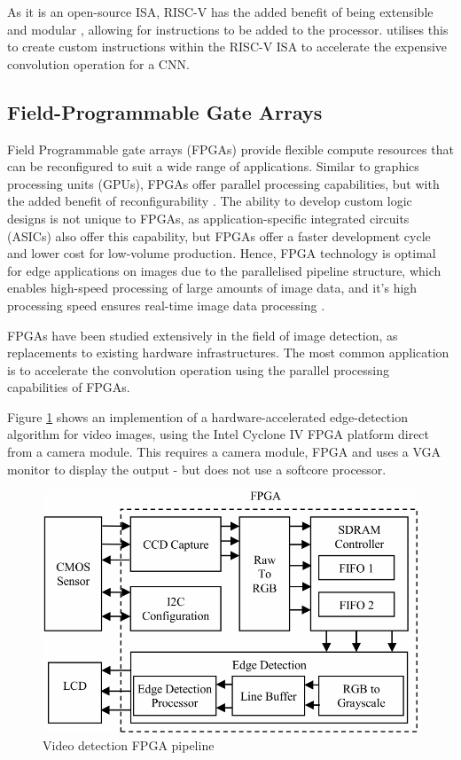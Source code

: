 As it is an open-source ISA, RISC-V has the added benefit of being extensible and modular \cite{Cryptography}, allowing for instructions to be added to the processor.
\cite{Reconfigurable} utilises this to create custom instructions within the RISC-V ISA to accelerate the expensive convolution operation for a CNN.

\subsection{Field-Programmable Gate Arrays}
Field Programmable gate arrays (FPGAs) provide flexible compute resources that can be reconfigured to suit a wide range of applications.
Similar to graphics processing units (GPUs), FPGAs offer parallel processing capabilities, but with the added benefit of reconfigurability \cite{Parallelism}.
The ability to develop custom logic designs is not unique to FPGAs, as application-specific integrated circuits (ASICs) also offer this capability, but FPGAs offer a faster development cycle and lower cost for low-volume production.
Hence, FPGA technology is optimal for edge applications on images due to the parallelised pipeline structure, which enables high-speed processing of large amounts of image data, and it's high processing speed ensures real-time image data processing \cite{Video}.

FPGAs have been studied extensively in the field of image detection, as replacements to existing hardware infrastructures. 
The most common application is to accelerate the convolution operation using the parallel processing capabilities of FPGAs. 

Figure \ref{fig:gradient} shows an implemention of a hardware-accelerated edge-detection algorithm for video images, using the Intel Cyclone IV FPGA platform direct from a camera module. 
This requires a camera module, FPGA and uses a VGA monitor to display the output - but does not use a softcore processor. 

\begin{figure}[h]
    \centering
    \includegraphics[width=1\textwidth]{Assets/Gradient.png}
    \caption{Video detection FPGA pipeline \cite{Gradient}}
    \label{fig:gradient}
\end{figure}

